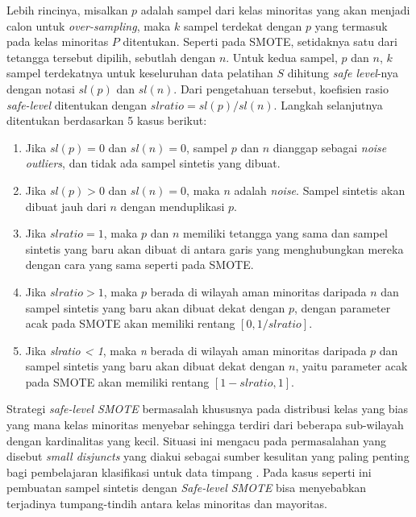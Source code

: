 Lebih rincinya, misalkan $ p $ adalah sampel dari kelas minoritas yang akan
menjadi calon untuk \textit{over-sampling}, maka $ k $ sampel terdekat dengan
$ p $ yang termasuk pada kelas minoritas $ P $ ditentukan.
Seperti pada SMOTE, setidaknya satu dari tetangga tersebut dipilih, sebutlah
dengan $ n $.
Untuk kedua sampel, $ p $ dan $ n $, $ k $ sampel terdekatnya untuk keseluruhan
data pelatihan $ S $ dihitung \textit{safe level}-nya dengan notasi $ sl(p) $
dan $ sl(n) $.
Dari pengetahuan tersebut, koefisien rasio \textit{safe-level} ditentukan
dengan $ slratio = sl(p) / sl(n) $.
Langkah selanjutnya ditentukan berdasarkan 5 kasus berikut:
\begin{enumerate}
	\item \label{case:safe-1} Jika $ sl(p) = 0 $ dan $ sl(n) = 0 $, sampel
	$ p $ dan $ n $ dianggap sebagai \textit{noise outliers}, dan tidak ada
	sampel sintetis yang dibuat.
	\item Jika $ sl(p) > 0 $ dan $ sl(n) = 0 $, maka $ n $
	adalah \textit{noise}.
	Sampel sintetis akan dibuat jauh dari $ n $ dengan menduplikasi $ p $.
	\item Jika $ slratio = 1 $, maka $ p $ dan $ n $ memiliki tetangga
	yang sama dan sampel sintetis yang baru akan dibuat di antara garis yang
	menghubungkan mereka dengan cara yang sama seperti pada SMOTE.
	\item Jika $ slratio > 1 $, maka $ p $ berada di wilayah
	aman minoritas daripada $ n $ dan sampel sintetis yang baru akan
	dibuat dekat dengan $ p $, dengan parameter acak pada SMOTE akan
	memiliki rentang $ [0, 1 / slratio] $.
	\item Jika \textit{slratio < 1}, maka \textit{n} berada di wilayah
	aman minoritas daripada $ p $ dan sampel sintetis yang baru akan
	dibuat dekat dengan $ n $, yaitu parameter acak pada SMOTE akan
	memiliki rentang $ [1 - slratio, 1] $.
\end{enumerate}

Strategi \textit{safe-level SMOTE} bermasalah khususnya pada distribusi kelas
yang bias yang mana kelas minoritas menyebar sehingga terdiri dari beberapa
sub-wilayah dengan kardinalitas yang kecil.
Situasi ini mengacu pada permasalahan yang disebut \textit{small disjuncts}
yang diakui sebagai sumber kesulitan yang paling penting bagi pembelajaran
klasifikasi untuk data timpang \parencite{jo2004class}.
Pada kasus seperti ini pembuatan sampel sintetis dengan \textit{Safe-level
SMOTE} bisa menyebabkan terjadinya tumpang-tindih antara kelas minoritas dan
mayoritas.

